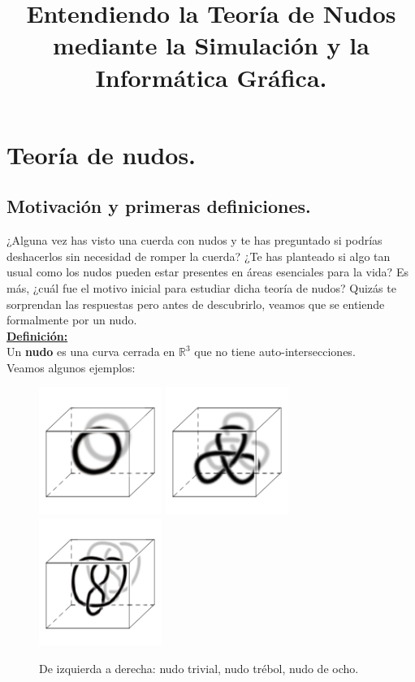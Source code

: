 \documentclass[14pt]{extarticle}
\title{Entendiendo la Teoría de Nudos mediante la Simulación y la Informática Gráfica.}
\begin{document}
\newtheorem{teo}{Teorema}[section]
\newtheorem{pro}{Proposición}[section]
\maketitle

\tableofcontents

\newpage
\section{Teoría de nudos. }\label{PrimerTema}

\subsection{Motivación y primeras definiciones.}
  ¿Alguna vez has visto una cuerda con nudos y te has preguntado si podrías deshacerlos sin necesidad de romper la cuerda? ¿Te has planteado si algo tan usual como los nudos pueden estar presentes en áreas esenciales para la vida? Es más, ¿cuál fue el motivo inicial para estudiar dicha teoría de nudos? Quizás te sorprendan las respuestas pero antes de descubrirlo, veamos que se entiende formalmente por un nudo.\\
  
\underline{\textbf{Definición:}}\\
 Un \textbf{nudo} es una curva cerrada en $\mathds{R}^{3}$ que no tiene auto-intersecciones.\\

Veamos algunos ejemplos:\\

  \begin{figure}[h!]
  	\includegraphics[width=4cm]{inudos/cubo1.png}
  	\includegraphics[width=4cm]{inudos/cubo2.png} 
  	\includegraphics[width=4cm]{inudos/cubo3.png}
  	\centering
  	\caption{De izquierda a derecha: nudo trivial, nudo trébol, nudo de ocho.}
  	\label{trid} 
  \end{figure}
\end{document}

